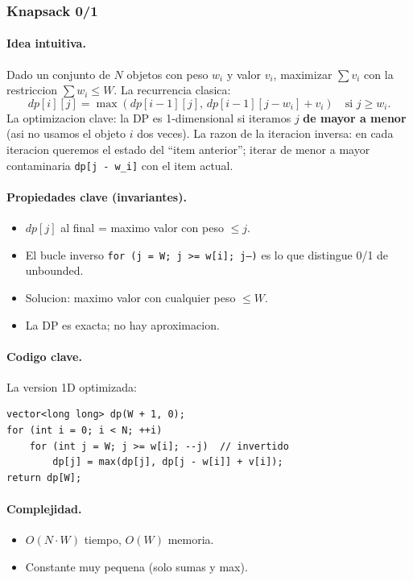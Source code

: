 ﻿\subsubsection{Knapsack 0/1}

\paragraph{Idea intuitiva.}
Dado un conjunto de $N$ objetos con peso $w_i$ y valor $v_i$, maximizar $\sum v_i$ con la restriccion $\sum w_i \le W$. La recurrencia clasica:
\[ dp[i][j] = \max(dp[i-1][j],\, dp[i-1][j - w_i] + v_i) \quad \text{si } j \ge w_i. \]
La optimizacion clave: la DP es 1-dimensional si iteramos $j$ \textbf{de mayor a menor} (asi no usamos el objeto $i$ dos veces). La razon de la iteracion inversa: en cada iteracion queremos el estado del ``item anterior''; iterar de menor a mayor contaminaria \texttt{dp[j - w\_i]} con el item actual.

\paragraph{Propiedades clave (invariantes).}
\begin{itemize}\setlength\itemsep{0pt}
	\item $dp[j]$ al final = maximo valor con peso $\le j$.
	\item El bucle inverso \texttt{for (j = W; j >= w[i]; j--)} es lo que distingue 0/1 de unbounded.
	\item Solucion: maximo valor con cualquier peso $\le W$.
	\item La DP es exacta; no hay aproximacion.
\end{itemize}

\paragraph{Codigo clave.}
La version 1D optimizada:
\begin{verbatim}
vector<long long> dp(W + 1, 0);
for (int i = 0; i < N; ++i)
    for (int j = W; j >= w[i]; --j)  // invertido
        dp[j] = max(dp[j], dp[j - w[i]] + v[i]);
return dp[W];
\end{verbatim}

\paragraph{Complejidad.}
\begin{itemize}\setlength\itemsep{0pt}
	\item $O(N \cdot W)$ tiempo, $O(W)$ memoria.
	\item Constante muy pequena (solo sumas y max).
\end{itemize}

